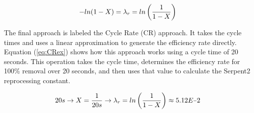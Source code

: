 \begin{equation} \hfill
-ln(1-X)  = \lambda_r = ln\left( \frac{1}{1-X} \right)
\hfill\label{eq:nat_log_3} \end{equation}

The final approach is labeled the Cycle Rate (CR) approach. It takes the cycle times and uses a linear approximation to generate the efficiency rate directly. Equation (\ref{eq:CRex}) shows how this approach works using a cycle time of 20 seconds. This operation takes the cycle time, determines the efficiency rate for 100\% removal over 20 seconds, and then uses that value to calculate the Serpent2 reprocessing constant.

\begin{equation} \hfill
20s \rightarrow X = \frac{1}{20 s} \rightarrow \lambda_r = ln \left( \frac{1}{1 - X} \right) \approx 5.12E\minus 2
\hfill\label{eq:CRex} \end{equation}








